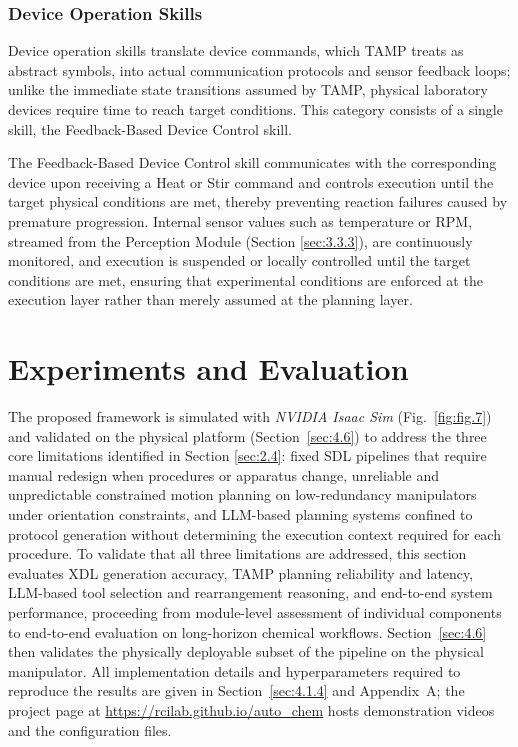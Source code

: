 \documentclass{ieeeaccess}
\newif\ifhighlight
\newcommand{\rev}[1]{\ifhighlight\hl{#1}\else#1\fi}
\begin{document}
\subsubsection{Device Operation Skills}\label{sec:3.5.2}
Device operation skills translate device commands, which TAMP treats as abstract symbols, into actual communication protocols and sensor feedback loops; unlike the immediate state transitions assumed by TAMP, physical laboratory devices require time to reach target conditions. This category consists of a single skill, the Feedback-Based Device Control skill.

The Feedback-Based Device Control skill communicates with the corresponding device upon receiving a Heat or Stir command and controls execution until the target physical conditions are met, thereby preventing reaction failures caused by premature progression. Internal sensor values such as temperature or RPM, streamed from the Perception Module (Section \ref{sec:3.3.3}), are continuously monitored, and execution is suspended or locally controlled until the target conditions are met, ensuring that experimental conditions are enforced at the execution layer rather than merely assumed at the planning layer.

\section{Experiments and Evaluation}\label{sec:4}
The proposed framework is simulated with \textit{NVIDIA Isaac Sim} (Fig.~\ref{fig:fig.7}) \rev{and validated on the physical platform (Section~\ref{sec:4.6})} to address the three core limitations identified in Section \ref{sec:2.4}: fixed SDL pipelines that require manual redesign when procedures or apparatus change, unreliable and unpredictable constrained motion planning on low-redundancy manipulators under orientation constraints, and LLM-based planning systems confined to protocol generation without determining the execution context required for each procedure. To validate that all three limitations are addressed, this section evaluates XDL generation accuracy, TAMP planning reliability and latency, LLM-based tool selection and rearrangement reasoning, and end-to-end system performance, proceeding from module-level assessment of individual components to end-to-end evaluation on long-horizon chemical workflows.
\rev{Section~\ref{sec:4.6} then validates the physically deployable subset of the pipeline on the physical manipulator.
All implementation details and hyperparameters required to reproduce the results are given in Section~\ref{sec:4.1.4} and Appendix~A; the project page} at \underline{https://rcilab.github.io/auto\_chem} \rev{hosts demonstration videos and the configuration files}.
\end{document}
